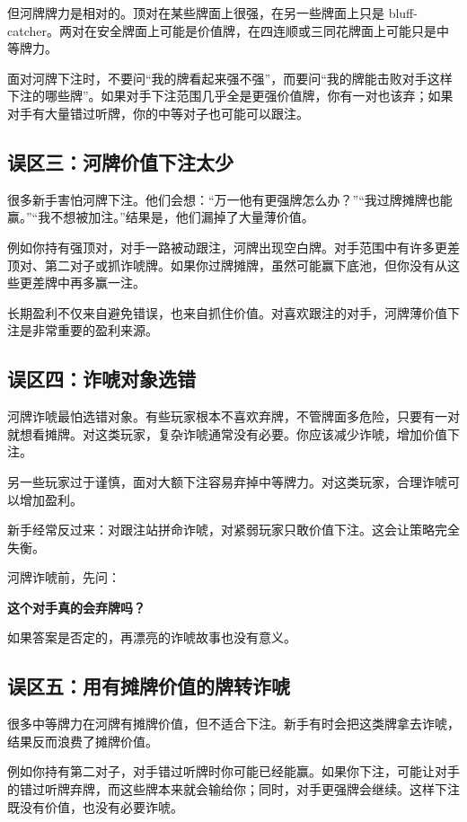 但河牌牌力是相对的。顶对在某些牌面上很强，在另一些牌面上只是 bluff-catcher。两对在安全牌面上可能是价值牌，在四连顺或三同花牌面上可能只是中等牌力。

面对河牌下注时，不要问“我的牌看起来强不强”，而要问“我的牌能击败对手这样下注的哪些牌”。如果对手下注范围几乎全是更强价值牌，你有一对也该弃；如果对手有大量错过听牌，你的中等对子也可能可以跟注。

\subsection{误区三：河牌价值下注太少}

很多新手害怕河牌下注。他们会想：“万一他有更强牌怎么办？”“我过牌摊牌也能赢。”“我不想被加注。”结果是，他们漏掉了大量薄价值。

例如你持有强顶对，对手一路被动跟注，河牌出现空白牌。对手范围中有许多更差顶对、第二对子或抓诈唬牌。如果你过牌摊牌，虽然可能赢下底池，但你没有从这些更差牌中再多赢一注。

长期盈利不仅来自避免错误，也来自抓住价值。对喜欢跟注的对手，河牌薄价值下注是非常重要的盈利来源。

\subsection{误区四：诈唬对象选错}

河牌诈唬最怕选错对象。有些玩家根本不喜欢弃牌，不管牌面多危险，只要有一对就想看摊牌。对这类玩家，复杂诈唬通常没有必要。你应该减少诈唬，增加价值下注。

另一些玩家过于谨慎，面对大额下注容易弃掉中等牌力。对这类玩家，合理诈唬可以增加盈利。

新手经常反过来：对跟注站拼命诈唬，对紧弱玩家只敢价值下注。这会让策略完全失衡。

河牌诈唬前，先问：

\begin{center}
\textbf{这个对手真的会弃牌吗？}
\end{center}

如果答案是否定的，再漂亮的诈唬故事也没有意义。

\subsection{误区五：用有摊牌价值的牌转诈唬}

很多中等牌力在河牌有摊牌价值，但不适合下注。新手有时会把这类牌拿去诈唬，结果反而浪费了摊牌价值。

例如你持有第二对子，对手错过听牌时你可能已经能赢。如果你下注，可能让对手的错过听牌弃牌，而这些牌本来就会输给你；同时，对手更强牌会继续。这样下注既没有价值，也没有必要诈唬。

